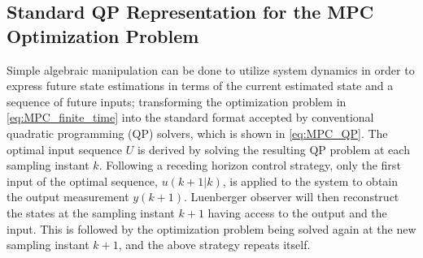 \subsection{Standard QP Representation for the MPC Optimization Problem} \label{app:QP}
Simple algebraic manipulation can be done to utilize system dynamics in order to express future state estimations in terms of the current estimated state and a sequence of future inputs; transforming the optimization problem in \eqref{eq:MPC_finite_time} into the standard format accepted by conventional quadratic programming (QP) solvers, which is shown in \eqref{eq:MPC_QP}.
The optimal input sequence $U$ is derived by solving the resulting QP problem at each sampling instant $k$. Following a receding horizon control strategy, only the first input of the optimal sequence, $u(k+1|k)$, is applied to the system to obtain the output measurement $y(k+1)$. Luenberger observer will then reconstruct the states at the sampling instant $k+1$ having access to the output and the input. This is followed by the optimization problem being solved again at the new sampling instant $k+1$, and the above strategy repeats itself.

